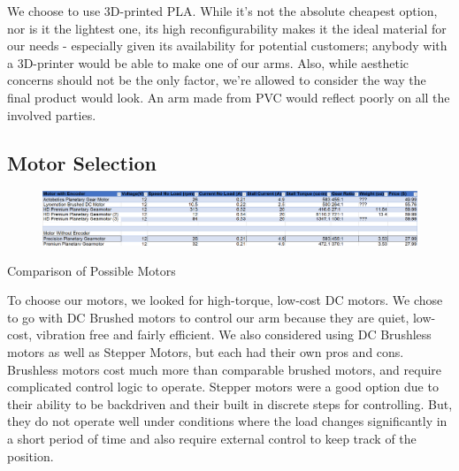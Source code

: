 





We choose to use 3D-printed PLA. While it's not the absolute cheapest option, nor is it the lightest one, its high reconfigurability makes it the ideal material for our needs - especially given its availability for potential customers; anybody with a 3D-printer would be able to make one of our arms. Also, while aesthetic concerns should not be the only factor, we're allowed to consider the way the final product would look. An arm made from PVC would reflect poorly on all the involved parties.


\subsection{Motor Selection}
\begin{table}[H]
	\begin{figure}[H]
		\includegraphics[width=\textwidth]{Pictures/motor_chart}
	\end{figure}
	\caption{Comparison of Possible Motors}
	\label{tbl:Motor_Chart}
\end{table}


To choose our motors, we looked for high-torque, low-cost DC motors. We chose to go with DC Brushed motors to control our arm because they are quiet, low-cost, vibration free and fairly efficient. We also considered using DC Brushless motors as well as Stepper Motors, but each had their own pros and cons. Brushless motors cost much more than comparable brushed motors, and require complicated control logic to operate. Stepper motors were a good option due to their ability to be backdriven and their built in discrete steps for controlling. But, they do not operate well under conditions where the load changes significantly in a short period of time and also require external control to keep track of the position.

